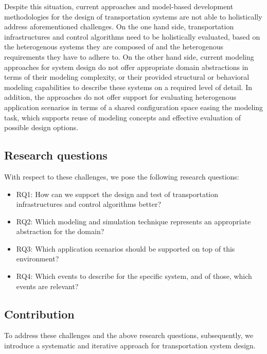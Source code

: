 \documentclass[graybox]{svmult}
\begin{document}
Despite this situation, current approaches and model-based development methodologies for the design of transportation systems are not able to holistically address aforementioned challenges. On the one hand side, transportation infrastructures and control algorithms need to be holistically evaluated, based on the heterogenous systems they are composed of and the heterogenous requirements they have to adhere to. On the other hand side, current modeling approaches for system design do not offer appropriate domain abstractions in terms of their modeling complexity, or their provided structural or behavioral modeling capabilities to describe these systems on a required level of detail. In addition, the approaches do not offer support for evaluating heterogenous application scenarios in terms of a shared configuration space easing the modeling task, which supports reuse of modeling concepts and effective evaluation of possible design options. 
\vspace{-2mm}

\subsection{Research questions}
With respect to these challenges, we pose the following research questions:
\begin{itemize}
	\item RQ1: How can we support the design and test of transportation infrastructures and control algorithms better?
	\item RQ2: Which modeling and simulation technique represents an appropriate abstraction for the domain?
	\item RQ3: Which application scenarios should be supported on top of this environment?
	\item RQ4: Which events to describe for the specific system, and of those, which events are relevant?
\end{itemize}
\vspace{-2mm}

\subsection{Contribution}
To address these challenges and the above research questions, subsequently, we introduce a systematic and iterative approach for transportation system design.
\end{document}
